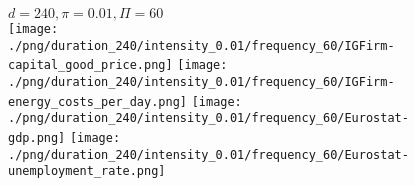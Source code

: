 \begin{figure}[ht!]
\centering\leavevmode
\begin{minipage}{13cm}
\centering\leavevmode
{$d=240, \pi=0.01, \Pi=60$}\\
\texttt{[image: ./png/duration\_240/intensity\_0.01/frequency\_60/IGFirm-capital\_good\_price.png]}
\texttt{[image: ./png/duration\_240/intensity\_0.01/frequency\_60/IGFirm-energy\_costs\_per\_day.png]}
\texttt{[image: ./png/duration\_240/intensity\_0.01/frequency\_60/Eurostat-gdp.png]}
\texttt{[image: ./png/duration\_240/intensity\_0.01/frequency\_60/Eurostat-unemployment\_rate.png]}
\end{minipage}
\end{figure}

